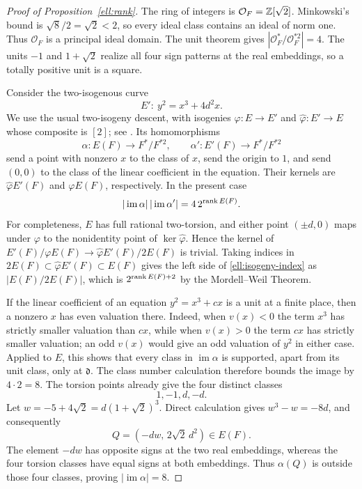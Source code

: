 \begin{proof}[Proof of Proposition~\ref{ell:rank}]
The ring of integers is $\mathcal O_F=\mathbb Z[\sqrt2]$.  Minkowski's bound is
$\sqrt8/2=\sqrt2<2$, so every ideal class contains an ideal of norm one.
Thus $\mathcal O_F$ is a principal ideal domain.  The unit theorem gives
$|\mathcal O_F^*/\mathcal O_F^{*2}|=4$.  The units $-1$ and $1+\sqrt2$
realize all four sign patterns at the real embeddings, so a totally
positive unit is a square.

Consider the two-isogenous curve
\[
                         E':\ y^2=x^3+4d^2x.
\]
We use the usual two-isogeny descent, with isogenies
$\varphi:E\to E'$ and $\widehat\varphi:E'\to E$ whose composite is $[2]$;
see \cite[Chapter~X, Proposition~4.7 and Example~4.9, pp.~336--337]{Silverman2009}.  Its homomorphisms
\[
 \alpha:E(F)\longrightarrow F^*/F^{*2},\qquad
 \alpha':E'(F)\longrightarrow F^*/F^{*2}
\]
send a point with nonzero $x$ to the class of $x$, send the origin to $1$,
and send $(0,0)$ to the class of the linear coefficient in the equation.
Their kernels are $\widehat\varphi E'(F)$ and $\varphi E(F)$, respectively.
In the present case
\begin{equation}\label{ell:isogeny-index}
             |\operatorname{im}\alpha|\,
             |\operatorname{im}\alpha'|=4\,2^{\operatorname{rank} E(F)}.
\end{equation}
For completeness, $E$ has full rational two-torsion, and either point
$(\pm d,0)$ maps under $\varphi$ to the nonidentity point of
$\ker\widehat\varphi$.  Hence the kernel of
$E'(F)/\varphi E(F)\to \widehat\varphi E'(F)/2E(F)$ is trivial.  Taking
indices in $2E(F)\subset\widehat\varphi E'(F)\subset E(F)$ gives the left
side of \eqref{ell:isogeny-index} as $|E(F)/2E(F)|$, which is
$2^{\operatorname{rank} E(F)+2}$ by the Mordell--Weil Theorem.

If the linear coefficient of an equation $y^2=x^3+cx$ is a unit at a
finite place, then a nonzero $x$ has even valuation there.  Indeed, when
$v(x)<0$ the term $x^3$ has strictly smaller valuation than $cx$, while
when $v(x)>0$ the term $cx$ has strictly smaller valuation; an odd
$v(x)$ would give an odd valuation of $y^2$ in either case.  Applied to
$E$, this shows that every class in $\operatorname{im}\alpha$ is supported,
apart from its unit class, only at $\mathfrak d$.  The class number
calculation therefore bounds the image by $4\cdot2=8$.  The torsion
points already give the four distinct classes
\[
                             1,-1,d,-d.
\]
Let $w=-5+4\sqrt2=d(1+\sqrt2)^3$.  Direct calculation gives
$w^3-w=-8d$, and consequently
\[
                  Q=(-dw,\,2\sqrt2\,d^2)\in E(F).
\]
The element $-dw$ has opposite signs at the two real embeddings, whereas
the four torsion classes have equal signs at both embeddings.  Thus
$\alpha(Q)$ is outside those four classes, proving
$|\operatorname{im}\alpha|=8$.


\end{proof}
